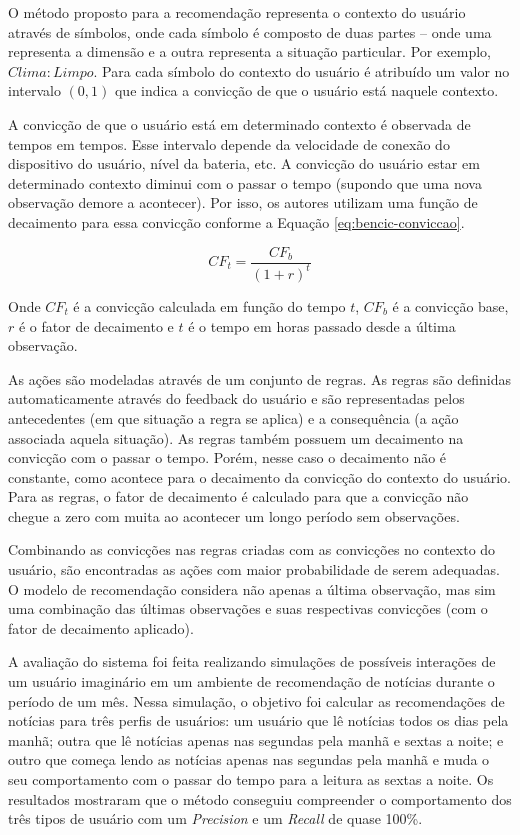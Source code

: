 O método proposto para a recomendação representa o contexto do usuário através de símbolos, onde cada símbolo é
composto de duas partes – onde uma representa a dimensão e a outra representa a situação particular. Por exemplo,
$Clima:Limpo$. Para cada símbolo do contexto do usuário é atribuído um valor no intervalo $(0, 1)$ que indica a convicção
de que o usuário está naquele contexto.

A convicção de que o usuário está em determinado contexto é observada de tempos em tempos. Esse intervalo depende da
velocidade de conexão do dispositivo do usuário, nível da bateria, etc. A convicção do usuário estar em determinado
contexto diminui com o passar o tempo (supondo que uma nova observação demore a acontecer). Por isso, os autores
utilizam uma função de decaimento para essa convicção conforme a Equação \ref{eq:bencic-conviccao}.

\begin{equation}
  \label{eq:bencic-conviccao}
  CF_t = \frac{CF_b}{(1+r)^t}
\end{equation}

Onde $CF_t$ é a convicção calculada em função do tempo $t$, $CF_b$ é a convicção base, $r$ é o fator de decaimento e $t$
é o tempo em horas passado desde a última observação.

As ações são modeladas através de um conjunto de regras. As regras são definidas automaticamente através do feedback do
usuário e são representadas pelos antecedentes (em que situação a regra se aplica) e a consequência (a ação associada
aquela situação). As regras também possuem um decaimento na convicção com o passar o tempo. Porém, nesse caso o
decaimento não é constante, como acontece para o decaimento da convicção do contexto do usuário. Para as regras, o fator
de decaimento é calculado para que a convicção não chegue a zero com muita ao acontecer um longo período sem observações.

Combinando as convicções nas regras criadas com as convicções no contexto do usuário, são encontradas as ações com
maior probabilidade de serem adequadas. O modelo de recomendação considera não apenas a última observação, mas sim uma
combinação das últimas observações e suas respectivas convicções (com o fator de decaimento aplicado).

A avaliação do sistema foi feita realizando simulações de possíveis interações de um usuário imaginário em um ambiente
de recomendação de notícias durante o período de um mês. Nessa simulação, o objetivo foi calcular as recomendações de
notícias para três perfis de usuários: um usuário que lê notícias todos os dias pela manhã; outra que lê notícias apenas
nas segundas pela manhã e sextas a noite; e outro que começa lendo as notícias apenas nas segundas pela manhã e muda o
seu comportamento com o passar do tempo para a leitura as sextas a noite. Os resultados mostraram que o método conseguiu
compreender o comportamento dos três tipos de usuário com um \textit{Precision} e um \textit{Recall} de quase 100\%.

